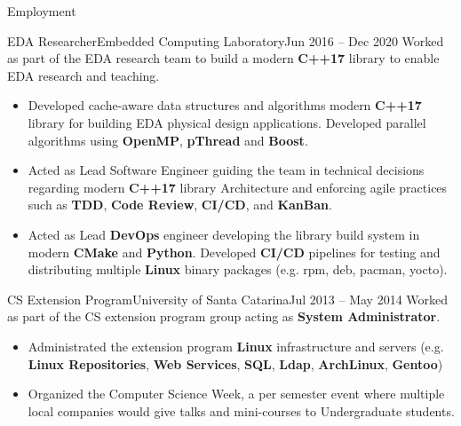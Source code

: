 \documentclass[calibri]{mcdowellcv}
\begin{document}
\begin{cvsection}{Employment}
		\begin{cvsubsectionxp}{EDA Researcher}{Embedded Computing Laboratory}{Jun 2016 -- Dec 2020}
			Worked as part of the EDA research team to build a modern \textbf{C++17} library to enable EDA research and teaching.
			\begin{itemize}
				\item Developed cache-aware data structures and algorithms modern \textbf{C++17} library for building EDA physical design applications. Developed parallel algorithms using \textbf{OpenMP}, \textbf{pThread} and \textbf{Boost}.
				\item Acted as Lead Software Engineer guiding the team in technical decisions regarding modern \textbf{C++17} library Architecture and enforcing agile practices such as \textbf{TDD}, \textbf{Code Review}, \textbf{CI/CD}, and \textbf{KanBan}.
				\item Acted as Lead \textbf{DevOps} engineer developing the library build system in modern \textbf{CMake} and \textbf{Python}. Developed \textbf{CI/CD} pipelines for testing and distributing multiple \textbf{Linux} binary packages (e.g. rpm, deb, pacman, yocto).
			\end{itemize}
		\end{cvsubsectionxp}

		\begin{cvsubsectionxp}{CS Extension Program}{University of Santa Catarina}{Jul 2013 -- May 2014}
			Worked as part of the CS extension program group acting as \textbf{System Administrator}.
			\begin{itemize}
				\item Administrated the extension program \textbf{Linux} infrastructure and servers (e.g. \textbf{Linux Repositories}, \textbf{Web Services}, \textbf{SQL}, \textbf{Ldap}, \textbf{ArchLinux}, \textbf{Gentoo})
				\item Organized the Computer Science Week, a per semester event where multiple local companies would give talks and mini-courses to Undergraduate students.
			\end{itemize}
		\end{cvsubsectionxp}
	\end{cvsection}
\end{document}
